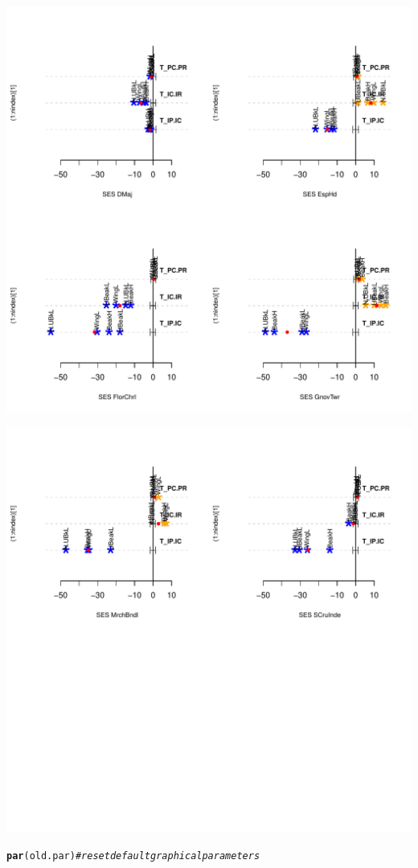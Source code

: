 \documentclass[12pt]{article}\usepackage[]{graphicx}\usepackage[]{color}
\makeatletter
\def\maxwidth{ %
  \ifdim\Gin@nat@width>\linewidth
    \linewidth
  \else
    \Gin@nat@width
  \fi
}
\newcommand{\hlcom}[1]{\textcolor[rgb]{0.678,0.584,0.686}{\textit{#1}}}%
\newcommand{\hlstd}[1]{\textcolor[rgb]{0.345,0.345,0.345}{#1}}%
\newcommand{\hlkwd}[1]{\textcolor[rgb]{0.737,0.353,0.396}{\textbf{#1}}}%
\newenvironment{kframe}{%
 \def\at@end@of@kframe{}%
 \ifinner\ifhmode%
  \def\at@end@of@kframe{\end{minipage}}%
  \begin{minipage}{\columnwidth}%
 \fi\fi%
 \def\FrameCommand##1{\hskip\@totalleftmargin \hskip-\fboxsep
 \colorbox{shadecolor}{##1}\hskip-\fboxsep
     \hskip-\linewidth \hskip-\@totalleftmargin \hskip\columnwidth}%
 \MakeFramed {\advance\hsize-\width
   \@totalleftmargin\z@ \linewidth\hsize
   \@setminipage}}%
 {\par\unskip\endMakeFramed%
 \at@end@of@kframe}
\newenvironment{knitrout}{}{} %
\makeatother
\begin{document}
\begin{knitrout}
{\centering \includegraphics[width=\maxwidth]{figure/unnamed-chunk-362} 

}




{\centering \includegraphics[width=\maxwidth]{figure/unnamed-chunk-363} 

}


\begin{kframe}\begin{alltt}
\hlkwd{par}\hlstd{(old.par)} \hlcom{# reset default graphical parameters}
\end{alltt}
\end{kframe}
\end{knitrout}
\end{document}
